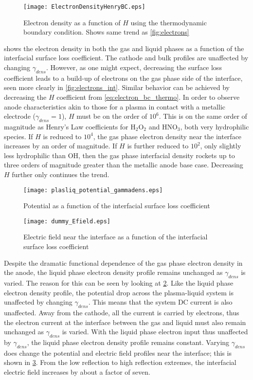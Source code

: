 \begin{figure}[htpb]
  \centering
  \texttt{[image: ElectronDensityHenryBC.eps]}
  \caption{Electron density as a function of $H$ using the thermodynamic boundary condition. Shows same trend as \cref{fig:electrons}}
  \label{fig:electrons_thermo}
\end{figure}

 shows the electron density in both the gas and liquid phases as a function of the interfacial surface loss coefficient. The cathode and bulk profiles are unaffected by changing $\gamma_{dens}$. However, as one might expect, decreasing the surface loss coefficient leads to a build-up of electrons on the gas phase side of the interface, seen more clearly in \cref{fig:electrons_int}. Similar behavior can be achieved by decreasing the $H$ coefficient from \cref{eq:electron_bc_thermo}. In order to observe anode characteristics akin to those for a plasma in contact with a metallic electrode ($\gamma_{dens}=1$), $H$ must be on the order of $10^6$. This is on the same order of magnitude as Henry's Law coefficients for H$_2$O$_2$ and HNO$_3$, both very hydrophilic species. If $H$ is reduced to $10^4$, the gas phase electron density near the interface increases by an order of magnitude. If $H$ is further reduced to $10^2$, only slightly less hydrophilic than OH, then the gas phase interfacial density rockets up to three orders of magnitude greater than the metallic anode base case. Decreasing $H$ further only continues the trend.

\begin{figure}[htpb]
  \centering
  \texttt{[image: plasliq\_potential\_gammadens.eps]}
  \caption{Potential as a function of the interfacial surface loss coefficient}
  \label{fig:potential}
\end{figure}

\begin{figure}[htpb]
  \centering
  \texttt{[image: dummy\_Efield.eps]}
  \caption{Electric field near the interface as a function of the interfacial surface loss coefficient}
  \label{fig:efield_int}
\end{figure}

Despite the dramatic functional dependence of the gas phase electron density in the anode, the liquid phase electron density profile remains unchanged as $\gamma_{dens}$ is varied. The reason for this can be seen by looking at \cref{fig:potential}. Like the liquid phase electron density profile, the potential drop across the plasma-liquid system is unaffected by changing $\gamma_{dens}$. This means that the system DC current is also unaffected. Away from the cathode, all the current is carried by electrons, thus the electron current at the interface between the gas and liquid must also remain unchanged as $\gamma_{dens}$ is varied. With the liquid phase electron input thus unaffected by $\gamma_{dens}$, the liquid phase electron density profile remains constant. Varying $\gamma_{dens}$ does change the potential and electric field profiles near the interface; this is shown in \cref{fig:efield_int}. From the low reflection to high reflection extremes, the interfacial electric field increases by about a factor of seven.

